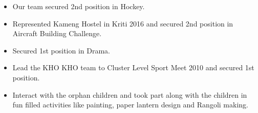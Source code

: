 

\begin{itemize}
  \item \small {Our team secured 2nd position in Hockey.}
\end{itemize}


\begin{itemize}
  \item \small {Represented Kameng Hostel in Kriti 2016 and secured 2nd position in Aircraft Building Challenge.}
\end{itemize}


\begin{itemize}
  \item \small {Secured 1st position in Drama.}
\end{itemize}


\begin{itemize}
  \item \small {Lead the KHO KHO team to Cluster Level Sport Meet 2010 and secured 1st position.}
\end{itemize}

\begin{itemize}
  \item \small {Interact with the orphan children and took part along with the children in fun filled activities like painting, paper lantern design and Rangoli making.}
\end{itemize}
  


